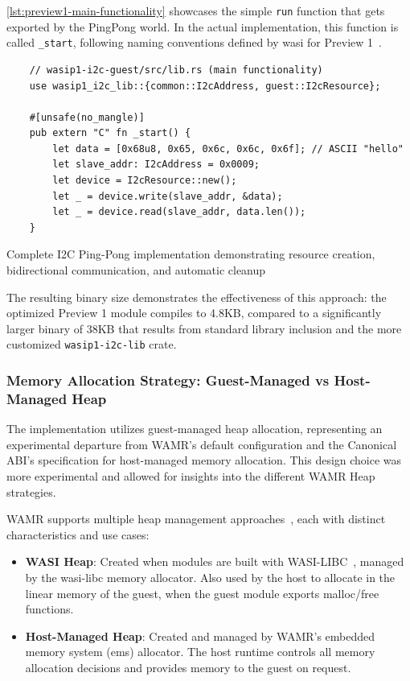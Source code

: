 \autoref{lst:preview1-main-functionality} showcases the simple \texttt{run} function that gets exported by the PingPong world. In the actual implementation, this function is called \texttt{\_start}, following naming conventions defined by \acrshort{wasi} for Preview 1~\cite{wasi_start_convention}.
\begin{listing}[H]
    \begin{verbatim}
    // wasip1-i2c-guest/src/lib.rs (main functionality)
    use wasip1_i2c_lib::{common::I2cAddress, guest::I2cResource};
    
    #[unsafe(no_mangle)]
    pub extern "C" fn _start() {
        let data = [0x68u8, 0x65, 0x6c, 0x6c, 0x6f]; // ASCII "hello"
        let slave_addr: I2cAddress = 0x0009;
        let device = I2cResource::new();
        let _ = device.write(slave_addr, &data);
        let _ = device.read(slave_addr, data.len());
    }
    \end{verbatim}
    \caption{Complete I2C Ping-Pong implementation demonstrating resource creation, bidirectional communication, and automatic cleanup}
    \label{lst:preview1-main-functionality}
\end{listing}

The resulting binary size demonstrates the effectiveness of this approach: the optimized Preview 1 module compiles to 4.8KB, compared to a significantly larger binary of 38KB that results from standard library inclusion and the more customized \texttt{wasip1-i2c-lib} crate.

\subsubsection{Memory Allocation Strategy: Guest-Managed vs Host-Managed Heap}

The implementation utilizes guest-managed heap allocation, representing an experimental departure from WAMR's default configuration and the Canonical ABI's specification for host-managed memory allocation. This design choice was more experimental and allowed for insights into the different WAMR Heap strategies. 

WAMR supports multiple heap management approaches~\cite{wamr_heaps}, each with distinct characteristics and use cases:

\begin{itemize}
    \item \textbf{WASI Heap}: Created when modules are built with WASI-LIBC~\cite{wasi_libc_git}, managed by the wasi-libc memory allocator. Also used by the host to allocate in the linear memory of the guest, when the guest module exports malloc/free functions.
    \item \textbf{Host-Managed Heap}: Created and managed by WAMR's embedded memory system (ems) allocator. The host runtime controls all memory allocation decisions and provides memory to the guest on request.
\end{itemize}

